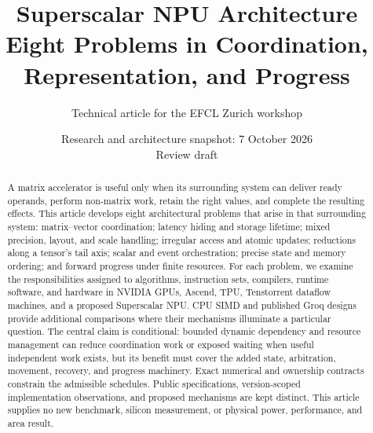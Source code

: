 \documentclass[11pt,a4paper]{article}
\title{Superscalar NPU Architecture\\\large Eight Problems in Coordination, Representation, and Progress}
\author{Technical article for the EFCL Zurich workshop}
\date{Research and architecture snapshot: 7 October 2026\\Review draft}
\begin{document}
\maketitle
\begin{abstract}
A matrix accelerator is useful only when its surrounding system can deliver ready operands, perform non-matrix work, retain the right values, and complete the resulting effects. This article develops eight architectural problems that arise in that surrounding system: matrix--vector coordination; latency hiding and storage lifetime; mixed precision, layout, and scale handling; irregular access and atomic updates; reductions along a tensor's tail axis; scalar and event orchestration; precise state and memory ordering; and forward progress under finite resources. For each problem, we examine the responsibilities assigned to algorithms, instruction sets, compilers, runtime software, and hardware in NVIDIA GPUs, Ascend, TPU, Tenstorrent dataflow machines, and a proposed Superscalar NPU. CPU SIMD and published Groq designs provide additional comparisons where their mechanisms illuminate a particular question. The central claim is conditional: bounded dynamic dependency and resource management can reduce coordination work or exposed waiting when useful independent work exists, but its benefit must cover the added state, arbitration, movement, recovery, and progress machinery. Exact numerical and ownership contracts constrain the admissible schedules. Public specifications, version-scoped implementation observations, and proposed mechanisms are kept distinct. This article supplies no new benchmark, silicon measurement, or physical power, performance, and area result.
\end{abstract}
\setcounter{tocdepth}{1}
\tableofcontents
\clearpage











\appendix

\clearpage


\end{document}
